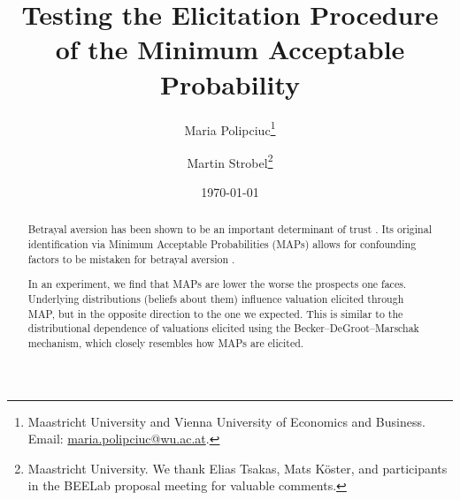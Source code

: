 
\title{Testing the Elicitation Procedure \\ of the Minimum Acceptable Probability}
\author{Maria Polipciuc\thanks{Maastricht University and Vienna University of Economics and Business. Email: \url{maria.polipciuc@wu.ac.at}.} \and Martin Strobel\thanks{Maastricht University. We thank Elias Tsakas, Mats K\"{o}ster, and participants in the BEELab proposal meeting for valuable comments.}}
\date{\today	\vspace{1cm}}
\titlepage



\begin{titlepage}
\clearpage
\maketitle
\thispagestyle{empty}


\begin{abstract}
Betrayal aversion has been shown to be an important determinant of trust \citep{Bohnet2004}.
Its original identification via Minimum Acceptable Probabilities (MAPs) allows for confounding factors to be mistaken for betrayal aversion \citep{Li2020a}.


In an experiment, we find that MAPs are lower the worse the prospects one faces.
Underlying distributions (beliefs about them) influence valuation elicited through MAP, but in the opposite direction to the one we expected.
This is similar to the distributional dependence of valuations elicited using the Becker--DeGroot--Marschak mechanism, which closely resembles how MAPs are elicited.

\end{abstract}
\end{titlepage}


